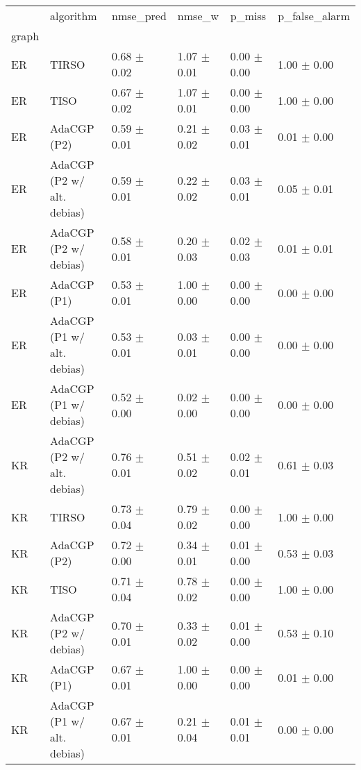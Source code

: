 \begin{tabular}{llllll}
\toprule
{} &                   algorithm &        nmse_pred &           nmse_w &           p_miss &    p_false_alarm \\
graph  &                             &                  &                  &                  &                  \\
\midrule
ER     &                       TIRSO &  0.68 $\pm$ 0.02 &  1.07 $\pm$ 0.01 &  0.00 $\pm$ 0.00 &  1.00 $\pm$ 0.00 \\
ER     &                        TISO &  0.67 $\pm$ 0.02 &  1.07 $\pm$ 0.01 &  0.00 $\pm$ 0.00 &  1.00 $\pm$ 0.00 \\
ER     &                 AdaCGP (P2) &  0.59 $\pm$ 0.01 &  0.21 $\pm$ 0.02 &  0.03 $\pm$ 0.01 &  0.01 $\pm$ 0.00 \\
ER     &  AdaCGP (P2 w/ alt. debias) &  0.59 $\pm$ 0.01 &  0.22 $\pm$ 0.02 &  0.03 $\pm$ 0.01 &  0.05 $\pm$ 0.01 \\
ER     &       AdaCGP (P2 w/ debias) &  0.58 $\pm$ 0.01 &  0.20 $\pm$ 0.03 &  0.02 $\pm$ 0.03 &  0.01 $\pm$ 0.01 \\
ER     &                 AdaCGP (P1) &  0.53 $\pm$ 0.01 &  1.00 $\pm$ 0.00 &  0.00 $\pm$ 0.00 &  0.00 $\pm$ 0.00 \\
ER     &  AdaCGP (P1 w/ alt. debias) &  0.53 $\pm$ 0.01 &  0.03 $\pm$ 0.01 &  0.00 $\pm$ 0.00 &  0.00 $\pm$ 0.00 \\
ER     &       AdaCGP (P1 w/ debias) &  0.52 $\pm$ 0.00 &  0.02 $\pm$ 0.00 &  0.00 $\pm$ 0.00 &  0.00 $\pm$ 0.00 \\
KR     &  AdaCGP (P2 w/ alt. debias) &  0.76 $\pm$ 0.01 &  0.51 $\pm$ 0.02 &  0.02 $\pm$ 0.01 &  0.61 $\pm$ 0.03 \\
KR     &                       TIRSO &  0.73 $\pm$ 0.04 &  0.79 $\pm$ 0.02 &  0.00 $\pm$ 0.00 &  1.00 $\pm$ 0.00 \\
KR     &                 AdaCGP (P2) &  0.72 $\pm$ 0.00 &  0.34 $\pm$ 0.01 &  0.01 $\pm$ 0.00 &  0.53 $\pm$ 0.03 \\
KR     &                        TISO &  0.71 $\pm$ 0.04 &  0.78 $\pm$ 0.02 &  0.00 $\pm$ 0.00 &  1.00 $\pm$ 0.00 \\
KR     &       AdaCGP (P2 w/ debias) &  0.70 $\pm$ 0.01 &  0.33 $\pm$ 0.02 &  0.01 $\pm$ 0.00 &  0.53 $\pm$ 0.10 \\
KR     &                 AdaCGP (P1) &  0.67 $\pm$ 0.01 &  1.00 $\pm$ 0.00 &  0.00 $\pm$ 0.00 &  0.01 $\pm$ 0.00 \\
KR     &  AdaCGP (P1 w/ alt. debias) &  0.67 $\pm$ 0.01 &  0.21 $\pm$ 0.04 &  0.01 $\pm$ 0.01 &  0.00 $\pm$ 0.00 \\

\end{tabular}
